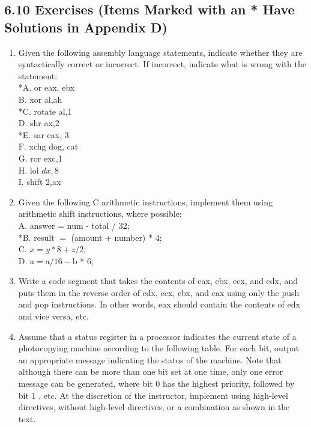 \documentclass[10pt]{book}
\begin{document}
\begin{center}
\begin{center}
\subsection*{6.10 Exercises (Items Marked with an * Have Solutions in Appendix D)}
\begin{enumerate}
  \item Given the following assembly language statements, indicate whether they are syntactically correct or incorrect. If incorrect, indicate what is wrong with the statement:\\
*A. or eax, ebx\\
B. xor al,ah\\
*C. rotate al,1\\
D. shr ax,2\\
*E. sar eax, 3\\
F. xchg dog, cat\\
G. ror exc,1\\
H. lol $d x, 8$\\
I. shift 2,ax
  \item Given the following C arithmetic instructions, implement them using arithmetic shift instructions, where possible:\\
A. answer = num - total / 32;\\
*B. result $=$ (amount + number) * 4;\\
C. $x=y * 8+z / 2$;\\
D. $\mathrm{a}=\mathrm{a} / 16-\mathrm{b}$ * 6;
  \item Write a code segment that takes the contents of eax, ebx, ecx, and edx, and puts them in the reverse order of edx, ecx, ebx, and eax using only the push and pop instructions. In other words, eax should contain the contents of edx and vice versa, etc.
  \item Assume that a status register in a processor indicates the current state of a photocopying machine according to the following table. For each bit, output an appropriate message indicating the status of the machine. Note that although there can be more than one bit set at one time, only one error message can be generated, where bit 0 has the highest priority, followed by bit 1 , etc. At the discretion of the instructor, implement using high-level directives, without high-level directives, or a combination as shown in the text.
\end{enumerate}


\end{center}
\end{center}
\end{document}
